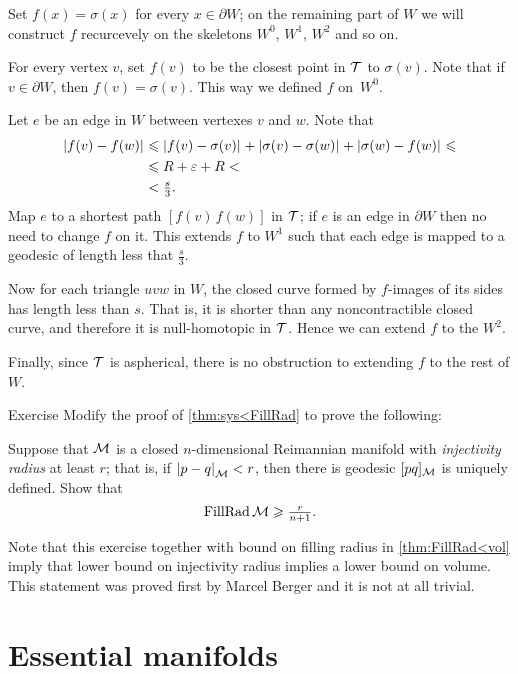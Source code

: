Set $f(x)=\sigma(x)$ for every $x\in \partial W$;
on the remaining part of $W$ we will construct $f$ recurcevely on the skeletons $W^0$, $W^1$, $W^2$ and so on.

For every vertex $v$, set $f(v)$ to be the closest point in $\mathcal{T}$ to $\sigma(v)$.
Note that if $v\in\partial W$, then $f(v)=\sigma(v)$.
This way we defined $f$ on~$W^0$.

Let $e$ be an edge in $W$ between vertexes $v$ and $w$.
Note that 
\begin{align*}
\dist{f(v)}{f(w)}{}
&\le\dist{f(v)}{\sigma(v)}{}
+\dist{\sigma(v)}{\sigma(w)}{}
+\dist{\sigma(w)}{f(w)}{}\le
\\
&\le R+\eps +R<
\\
&<\tfrac s3.
\end{align*}
Map $e$ to a shortest path $[f(v)\,f(w)]$ in $\mathcal{T}$;
if $e$ is an edge in $\partial W$ then no need to change $f$ on it.
This extends $f$ to $W^1$ such that each edge is mapped to a geodesic of length less that $\tfrac s3$.

Now for each triangle $uvw$ in $W$, the closed curve formed by $f$-images of its sides has length less than $s$.
That is, it is shorter than any noncontractible closed curve,
and therefore it is null-homotopic in $\mathcal{T}$.
Hence we can extend $f$ to the $W^2$.

Finally, since $\mathcal{T}$ is aspherical, there is no obstruction to extending $f$ to the rest of $W$.
\qeds

\begin{thm}{Exercise}\label{ex:fillrad-inj}
Modify the proof of \ref{thm:sys<FillRad} to prove the following:

Suppose that $\mathcal{M}$ is a closed $n$-dimensional Reimannian manifold with \emph{injectivity radius} at least $r$; that is, if $\dist{p}{q}{\spc{M}}<r$, then there is geodesic $[pq]_{\mathcal{M}}$ is uniquely defined.
Show that
\[\operatorname{\rm FillRad}\mathcal{M}\geqslant \tfrac{r}{n+1}.\]
 
\end{thm}

Note that this exercise together with bound on filling radius in \ref{thm:FillRad<vol} imply that lower bound on injectivity radius implies a lower bound on volume.
This statement was proved first by Marcel Berger \cite{berger} and it is not at all trivial.

\section{Essential manifolds}

